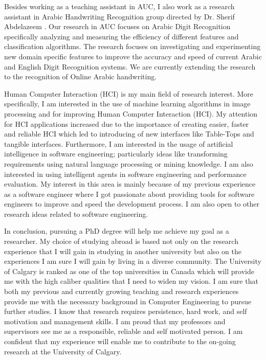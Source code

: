 \documentclass[12pt]{article}%
\begin{document}
	Besides working as a teaching assistant in AUC, I also work as a research assistant in Arabic Handwriting Recognition group directed by Dr. Sherif Abdelazeem . Our research in AUC focuses on Arabic Digit Recognition specifically analyzing and measuring the efficiency of different features and classification algorithms.  The research focuses on investigating and experimenting new domain specific features to improve the accuracy and speed of current Arabic and English Digit Recognition systems. We are currently extending the research to the recognition of Online Arabic handwriting.

	Human Computer Interaction (HCI) is my main field of research interest. More specifically, I am interested in the use of machine learning algorithms in image processing and for improving Human Computer Interaction (HCI). My attention for HCI applications increased due to the importance of creating easier, faster and reliable HCI which led to introducing of new interfaces like Table-Tops and tangible interfaces. Furthermore, I am interested in the usage of artificial intelligence in software engineering; particularly ideas like transforming requirements using natural language processing or mining knowledge. I am also interested in using intelligent agents in software engineering and performance evaluation.  My interest in this area is mainly because of my previous experience as a software engineer where I got passionate about providing tools for software engineers to improve and speed the development process. I am also open to other research ideas related to software engineering.

 	In conclusion, pursuing a PhD degree will help me achieve my goal as a researcher. My choice of studying abroad is based not only on the research experience that I will gain in  studying in another university but also on the experiences I am sure I will gain by living in a diverse community. The University of Calgary is ranked as one of the top universities in Canada which will provide me with the high caliber qualities that I need to widen my vision. I am sure that both my previous and currently growing teaching and research experiences provide me with the necessary background in Computer Engineering to pursue further studies. I know that research requires persistence, hard work, and self motivation and management skills. I am proud that my professors and supervisors see me as a responsible, reliable and self motivated person. I am confident that my experience will enable me to contribute to the on-going research at the University of Calgary.
\end{document}
